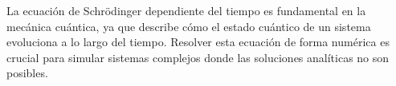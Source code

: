 La ecuación de Schrödinger dependiente del tiempo es fundamental en la mecánica cuántica, ya que describe cómo el estado cuántico de un sistema evoluciona a lo largo del tiempo. Resolver esta ecuación de forma numérica es crucial para simular sistemas complejos donde las soluciones analíticas no son posibles.
